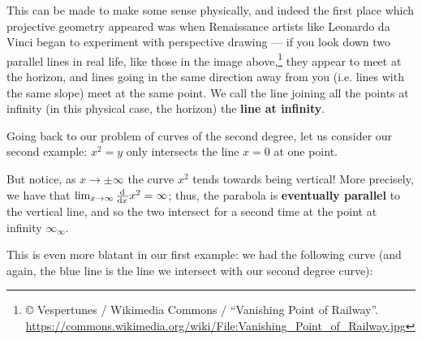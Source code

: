 \documentclass[a4paper,leqno]{article}
\numberwithin{equation}{section}
\theoremstyle{definition}
\theoremstyle{remark}
\newcommand{\df}[1]{\textbf{#1}}
\begin{document}
This can be made to make some sense physically, and indeed the first place which projective geometry appeared was when Renaissance artists
like Leonardo da Vinci began to experiment with perspective drawing --- if you look down two parallel lines in real life, like those in the
image above,\footnote{© Vespertunes / Wikimedia Commons / ``Vanishing Point of Railway''. \url{https://commons.wikimedia.org/wiki/File:Vanishing_Point_of_Railway.jpg}}
they appear to meet at the horizon, and lines going in the same direction away from you (i.e. lines with the same slope) meet
at the same point. We call the line joining all the points at infinity (in this physical case, the horizon) the \df{line at infinity}.

Going back to our problem of curves of the second degree, let us consider our second example: $ x^2 = y $ only intersects the line $ x = 0 $
at one point.

\begin{center}
\end{center}

But notice, as $ x \to \pm \infty $ the curve $ x^2 $ tends towards being vertical! More precisely, we have
that $ \lim_{x \to \infty} \od{}{x} x^2 = \infty $; thus, the parabola is \df{eventually parallel} to the
vertical line, and so the two intersect for a second time at the point at infinity $ \infty_\infty $.

This is even more blatant in our first example: we had the following curve (and again, the blue line is the
line we intersect with our second degree curve):

\begin{center}
\end{center}
\end{document}
